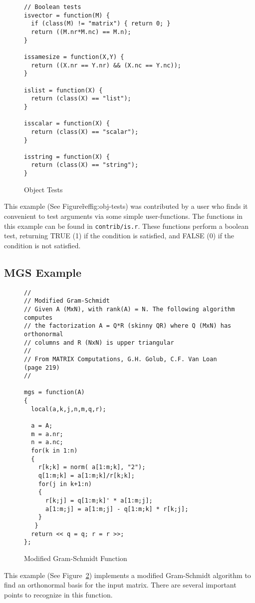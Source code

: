 \begin{figure}
\begin{verbatim}
// Boolean tests
isvector = function(M) {
  if (class(M) != "matrix") { return 0; }
  return ((M.nr*M.nc) == M.n);
}

issamesize = function(X,Y) {
  return ((X.nr == Y.nr) && (X.nc == Y.nc));
}

islist = function(X) {
  return (class(X) == "list");
}

isscalar = function(X) {
  return (class(X) == "scalar");
}

isstring = function(X) {
  return (class(X) == "string");
}
\end{verbatim}
\caption{Object Tests} \label{fig:obj-tests}
\end{figure}

   This example (See Figure\~ref{fig:obj-tests}) was contributed by a
   user who finds it convenient to test arguments via some simple
   user-functions. The functions in this example can be found in
   \verb+contrib/is.r+. These functions perform a boolean test,
   returning TRUE (1) if the condition is satisfied, and FALSE (0) if
   the condition is not satisfied.

\subsection{MGS Example}

\begin{figure}
\begin{verbatim}
//
// Modified Gram-Schmidt
// Given A (MxN), with rank(A) = N. The following algorithm computes
// the factorization A = Q*R (skinny QR) where Q (MxN) has orthonormal
// columns and R (NxN) is upper triangular
//
// From MATRIX Computations, G.H. Golub, C.F. Van Loan (page 219)
// 

mgs = function(A)
{
  local(a,k,j,n,m,q,r);

  a = A;
  m = a.nr;
  n = a.nc;
  for(k in 1:n)
  {
    r[k;k] = norm( a[1:m;k], "2");
    q[1:m;k] = a[1:m;k]/r[k;k];
    for(j in k+1:n)
    {
      r[k;j] = q[1:m;k]' * a[1:m;j];
      a[1:m;j] = a[1:m;j] - q[1:m;k] * r[k;j];
    }
   }
  return << q = q; r = r >>;
};
\end{verbatim}
\caption{Modified Gram-Schmidt Function} \label{fig:mgs}
\end{figure}

   This example (See Figure~\ref{fig:mgs}) implements a modified
   Gram-Schmidt algorithm to find an orthonormal basis for the input
   matrix. There are several important points to recognize in this
   function.

